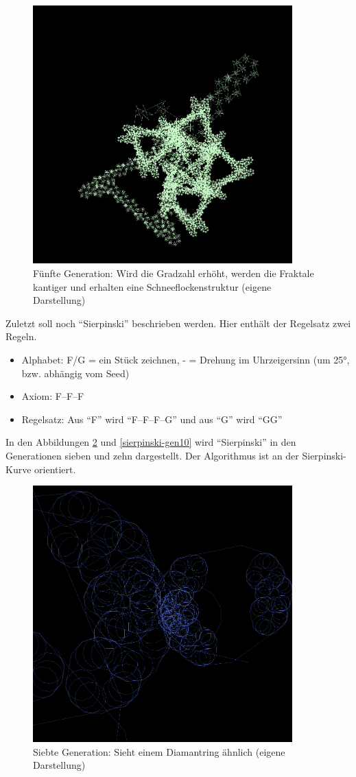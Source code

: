 \documentclass[../mciAusarbeitung.tex]{subfiles}
\begin{document}
\begin{figure}[H]
\includegraphics[width=10cm]{img/fractal-gen5-grad.png}
\caption[Fünfte Generation: Erhöhung der Gradzahl]{Fünfte Generation: Wird die Gradzahl erhöht, werden die Fraktale kantiger und erhalten eine Schneeflockenstruktur (eigene Darstellung)}
\label{fractal-gen5-grad}
\end{figure}

Zuletzt soll noch "`Sierpinski"' beschrieben werden. Hier enthält der Regelsatz zwei Regeln.
\begin{itemize}
\item Alphabet: F/G = ein Stück zeichnen, - = Drehung im Uhrzeigersinn (um 25°, bzw. abhängig vom Seed)
\item Axiom: F--F--F
\item Regelsatz: Aus "`F"' wird "`F--F--F--G"' und aus "`G"' wird "`GG"'
\end{itemize}

In den Abbildungen \ref{sierpinski-gen7} und \ref{sierpinski-gen10} wird "`Sierpinski"' in den Generationen sieben und zehn dargestellt. Der Algorithmus ist an der Sierpinski-Kurve orientiert.

\begin{figure}[H]
\includegraphics[width=10cm]{img/sierpinski-gen7.png}
\caption{Siebte Generation: Sieht einem Diamantring ähnlich (eigene Darstellung)}
\label{sierpinski-gen7}
\end{figure}
\end{document}
